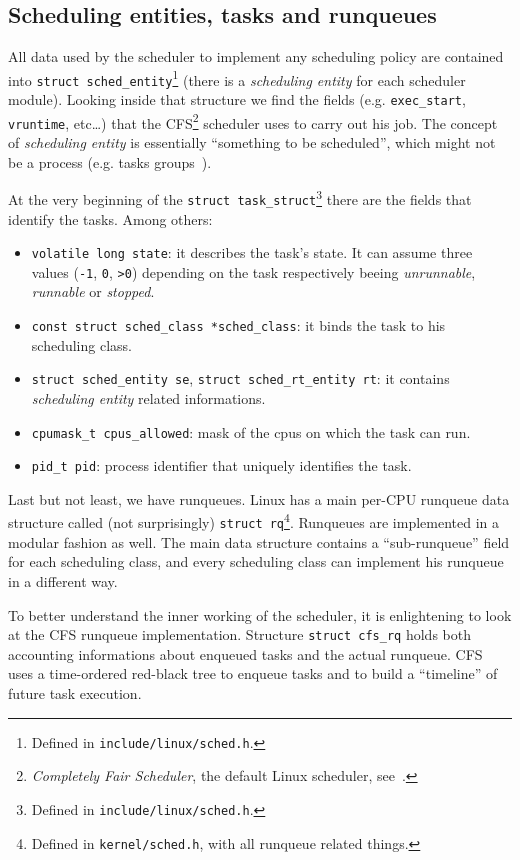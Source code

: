 \subsection{Scheduling entities, tasks and runqueues\label{sec:LinuxSched_runqueue}}
All data used by the scheduler to implement any scheduling policy are
contained into \texttt{struct sched\_entity}\footnote{Defined in
  \texttt{include/linux/sched.h}.} (there is a \emph{scheduling
  entity} for each scheduler module). Looking inside that structure we
find the fields (e.g.  \texttt{exec\_start}, \texttt{vruntime},
etc\dots) that the CFS\footnote{\emph{Completely Fair Scheduler}, the
  default Linux scheduler, see~\cite{sched-design-CFS}.} scheduler
uses to carry out his job.  The concept of \emph{scheduling entity} is
essentially ``something to be scheduled'', which might not be a
process (e.g. tasks groups~\cite{corbet07}).

At the very beginning of the \texttt{struct task\_struct}\footnote{Defined in
\texttt{include/linux/sched.h}.}
there are the fields that identify the tasks. Among others:
\begin{itemize}
\item \texttt{volatile long state}: it describes the task's state. It can assume
three values (\texttt{-1}, \texttt{0}, \texttt{>0}) depending on the task
respectively beeing \emph{unrunnable}, \emph{runnable} or \emph{stopped}.
\item \texttt{const struct sched\_class *sched\_class}: it binds the task to
his scheduling class.
\item \texttt{struct sched\_entity se}, \texttt{struct sched\_rt\_entity rt}: it 
contains \emph{scheduling entity} related informations.
\item \texttt{cpumask\_t cpus\_allowed}: mask of the cpus on which the task can
run.
\item \texttt{pid\_t pid}: process identifier that uniquely identifies the
task.
\end{itemize} 

Last but not least, we have runqueues. Linux has a main per-CPU runqueue data
structure called (not surprisingly) \texttt{struct rq}\footnote{Defined in
\texttt{kernel/sched.h}, with all runqueue related things.}. Runqueues are
implemented in a modular fashion as
well. The main data structure contains a ``sub-runqueue'' field for each
scheduling class, and every scheduling class can implement his runqueue in
a different way.

To better understand the inner working of the scheduler, it is
enlightening to look at the CFS runqueue implementation. Structure
\texttt{struct cfs\_rq} holds both accounting informations about
enqueued tasks and the actual runqueue. CFS uses a time-ordered
red-black tree to enqueue tasks and to build a ``timeline'' of future
task execution.

